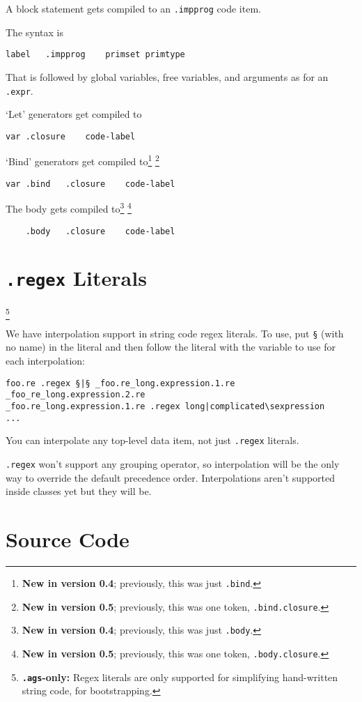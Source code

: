 \documentclass{report}
\newcommand\stringcode[1]{\texttt{#1}}
\newcommand\agsonly[1]{\footnote{\textbf{\texttt{.ags}-only: }#1}}
\newcommand\new[2]{\footnote{\textbf{New in version #1}; previously, #2}}
\begin{document}
A block statement gets compiled to an \verb+.impprog+ code item.

The syntax is
\begin{verbatim}
label	.impprog	primset	primtype
\end{verbatim}
That is followed by global variables, free variables, and arguments as for an \verb+.expr+.

`Let' generators get compiled to
\begin{verbatim}
var	.closure	code-label
\end{verbatim}
`Bind' generators get compiled to\new{0.4}{this was just \stringcode{.bind}.} \new{0.5}{this was one token, \stringcode{.bind.closure}.}
\begin{verbatim}
var	.bind	.closure	code-label
\end{verbatim}
The body gets compiled to\new{0.4}{this was just \stringcode{.body}.} \new{0.5}{this was one token, \stringcode{.body.closure}.}
\begin{verbatim}
	.body	.closure	code-label
\end{verbatim}

\chapter{\stringcode{.regex} Literals}\agsonly{Regex literals are only supported for simplifying hand-written string code, for bootstrapping.}

We have interpolation support in string code regex literals.
To use, put \stringcode{§} (with no name) in the literal
and then follow the literal with the variable to use for each interpolation:
\begin{verbatim}
foo.re .regex §|§ _foo.re_long.expression.1.re _foo_re_long.expression.2.re
_foo.re_long.expression.1.re .regex long|complicated\sexpression
...
\end{verbatim}

You can interpolate any top-level data item, not just \stringcode{.regex} literals.

\stringcode{.regex} won't support any grouping operator,
so interpolation will be the only way to override the default precedence order.
Interpolations aren't supported inside classes yet but they will be.

\chapter{Source Code}
\end{document}
